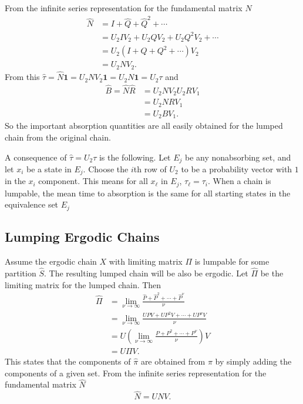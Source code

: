 \documentclass[12pt]{article}
\begin{document}
From the infinite series representation for the fundamental matrix \( N \)
\begin{align*}
    \hat{N} &= I + \hat{Q} + \hat{Q}^2 + \cdots \\
    &= U_2 I V_2+ U_2 Q V_2 + U_2 Q^2 V_2 + \cdots \\
    &= U_2 (I + Q + Q^2 + \cdots) V_2 \\
    &= U_2 N V_2.
\end{align*}
From this \( \hat{\tau} = \hat{N} \mathbf{1} = U_2 N V_2 \mathbf{1} = U_2
N \mathbf{1} = U_2 \tau \) and
\begin{align*}
    \hat{B} = \hat{N} \hat{R} &= U_2 N V_2 U_2 R V_1 \\
    &= U_2 N R V_1 \\
    &= U_2 B V_1.
\end{align*}
So the important absorption quantities are all easily obtained for the
lumped chain from the original chain.

A consequence of \( \hat{\tau} = U_2 \tau \) is the following.  Let \( E_j
\) be any nonabsorbing set, and let \( x_i \) be a state in \( E_j \).
Choose the \( i \)th row of \( U_2 \) to be a probability vector with \(
1 \) in the \( x_i \) component.  This means for all \( x_\ell \) in \(
E_j \), \( \tau_\ell = \tau_i \).  When a chain is lumpable, the mean
time to absorption is the same for all starting states in the
equivalence set \( E_j \)

\subsection*{Lumping Ergodic Chains}

Assume the ergodic chain \( X \) with limiting matrix \( \Pi \) is
lumpable for some partition \( \hat{S} \). The resulting lumped chain
will be also be ergodic.  Let \( \hat{\Pi} \) be the limiting matrix for
the lumped chain.  Then
\begin{align*}
    \hat{\Pi} &= \lim_{\nu \to \infty} \frac{\hat{P} + \hat{P}^2 +
    \cdots + \hat{P}^{\nu}}{\nu} \\
    &= \lim_{\nu \to \infty} \frac{UPV + UP^2V + \cdots + UP^{\nu}V}{\nu}
    \\
    &= U \left( \lim_{\nu \to \infty} \frac{P + P^2 + \cdots + P^{\nu}}{\nu}
    \right) V \\
    & = U \Pi V.
\end{align*}
This states that the components of \( \hat{\pi} \) are obtained from \(
\pi \) by simply adding the components of a given set.  From the
infinite series representation for the fundamental matrix \( \hat{N} \)
\[
    \hat{N} = U N V.
\]
\end{document}
